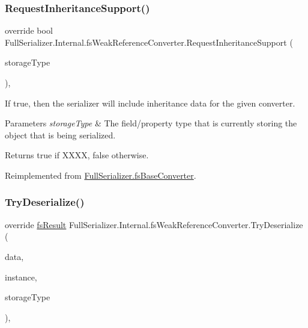 \subsubsection{\texorpdfstring{Request\+Inheritance\+Support()}{RequestInheritanceSupport()}}
{\footnotesize\ttfamily override bool Full\+Serializer.\+Internal.\+fs\+Weak\+Reference\+Converter.\+Request\+Inheritance\+Support (\begin{DoxyParamCaption}\item[{Type}]{storage\+Type }\end{DoxyParamCaption})\hspace{0.3cm}{\ttfamily [inline]}, {\ttfamily [virtual]}}



If true, then the serializer will include inheritance data for the given converter. 


\begin{DoxyParams}{Parameters}
{\em storage\+Type} & The field/property type that is currently storing the object that is being serialized.\\
\hline
\end{DoxyParams}
\begin{DoxyReturn}{Returns}
{\ttfamily true} if X\+X\+XX, {\ttfamily false} otherwise.
\end{DoxyReturn}


Reimplemented from \hyperlink{class_full_serializer_1_1fs_base_converter_a84447285540ab6b51efc2399d144c60c}{Full\+Serializer.\+fs\+Base\+Converter}.

\mbox{\label{class_full_serializer_1_1_internal_1_1fs_weak_reference_converter_a0b1b66f55b2e380a0b17f2944dc0ff84}} 
\subsubsection{\texorpdfstring{Try\+Deserialize()}{TryDeserialize()}}
{\footnotesize\ttfamily override \hyperlink{struct_full_serializer_1_1fs_result}{fs\+Result} Full\+Serializer.\+Internal.\+fs\+Weak\+Reference\+Converter.\+Try\+Deserialize (\begin{DoxyParamCaption}\item[{\hyperlink{class_full_serializer_1_1fs_data}{fs\+Data}}]{data,  }\item[{ref object}]{instance,  }\item[{Type}]{storage\+Type }\end{DoxyParamCaption})\hspace{0.3cm}{\ttfamily [inline]}, {\ttfamily [virtual]}}



